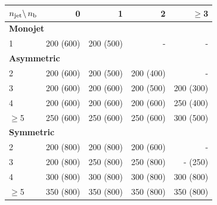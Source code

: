 \begin{table}[htb!]
  \label{tab:binning}
  \centering
  \footnotesize
  \begin{tabular}{ lrrrr }
    \hline
    $n_{\text{jet}} \backslash\, n_{\text{b}}$ & 0         & 1         & 2         & $\geq$3                       \\
    \hline
    \multicolumn{5}{l}{\bf Monojet}                                                              \\
    1                        & 200 (600) & 200 (500) & -     & -                         \\
    \multicolumn{5}{l}{\bf Asymmetric}                                                           \\
    2                        & 200 (600) & 200 (500) & 200 (400) & -                         \\
    3                        & 200 (600) & 200 (600) & 200 (500) & 200 (300)                     \\
    4                        & 200 (600) & 200 (600) & 200 (600) & 250 (400)                     \\
    $\geq$5                  & 250 (600) & 250 (600) & 250 (600) & 300 (500)                     \\
    \multicolumn{5}{l}{\bf Symmetric}                                                            \\
    2                        & 200 (800) & 200 (800) & 200 (600) & -                         \\
    3                        & 200 (800) & 250 (800) & 250 (800) & \phantom{0}-\phantom{0} (250) \\
    4                        & 300 (800) & 300 (800) & 300 (800) & 300 (800)                     \\
    $\geq$5                  & 350 (800) & 350 (800) & 350 (800) & 350 (800)                     \\
    \hline
  \end{tabular}
\end{table}

